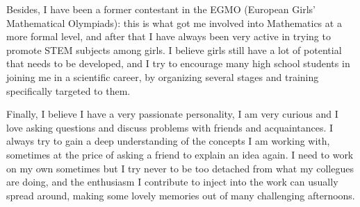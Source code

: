 \documentclass[12pt, a4paper]{article}
\begin{document}



Besides, I have been a former contestant in the EGMO (European Girls' Mathematical Olympiads): this is what got me involved into Mathematics at a more formal level, and after that I have always been very active in trying to promote STEM subjects among girls. I believe girls still have a lot of potential that needs to be developed, and I try to encourage many high school students in joining me in a scientific career, by organizing several stages and training specifically targeted to them.

Finally, I believe I have a very passionate personality, I am very curious and I love asking questions and discuss problems with friends and acquaintances. I always try to gain a deep understanding of the concepts I am working with, sometimes at the price of asking a friend to explain an idea again. I need to work on my own sometimes but I try never to be too detached from what my collegues are doing, and the enthusiasm I contribute to inject into the work can usually spread around, making some lovely memories out of many challenging afternoons.
\end{document}
